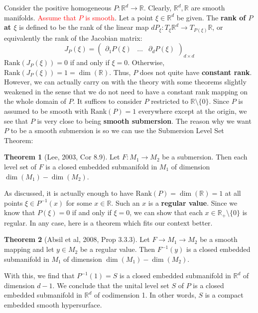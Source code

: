 \documentclass{article}
\theoremstyle{definition}
\newcommand{\p}{\partial}
\newcommand{\R}{\mathbb{R}}
\theoremstyle{theorem}
\newtheorem{theorem}{Theorem}[section]
\begin{document}
Consider the positive homogeneous $P: \R^d \to \R$. Clearly, $\R^d, \R$ are smooth manifolds. \textcolor{red}{Assume that $P$ is smooth}. Let a point $\xi\in \R^d$ be given. The \textbf{rank of $P$ at $\xi$} is defined to be the rank of the linear map $d P_\xi: T_\xi \R^d \to T_{P(\xi)} \R $, or equivalently the rank of the Jacobian matrix:
\begin{equation*}
    J_P(\xi) = \begin{pmatrix}
    \p_1 P(\xi) & \dots & \p_{d} P(\xi)
    \end{pmatrix}_{ d \times d}
\end{equation*}
$\text{Rank}(J_P(\xi)) = 0$ if and only if $\xi = 0$. Otherwise, $\text{Rank}(J_P(\xi)) = 1 = \dim(\R)$. Thus, $P$ does not quite have \textbf{constant rank}. However, we can actually carry on with the theory with some theorems slightly weakened in the sense that we do not need to have a constant
rank mapping on the whole domain of $P$. It suffices to consider $P$ restricted to $\R\setminus \{0 \}$.  Since $P$ is assumed to be smooth with $\text{Rank}(P) = 1$ everywhere except at the origin, we see that $P$ is very close to being \textbf{smooth submersion}. The reason why we want $P$ to be a smooth submersion is so we can use the Submersion Level Set Theorem:
\begin{theorem}[Lee, 2003, Cor 8.9]
Let $F: M_1 \to M_2$ be a submersion. Then each level set of $F$ is a closed embedded submanifold in $M_1$ of dimension $\dim(M_1) - \dim(M_2)$.  
\end{theorem}

As discussed, it is actually enough to have $\text{Rank}(P) = \dim(\R) = 1$ at all points $\xi \in P^{-1}(x)$ for some $x\in \R$. Such an $x$ is a \textbf{regular value}. Since we know that $P(\xi) = 0$ if and only if $\xi = 0$, we can show that each $x\in \R_+\setminus\{ 0 \}$ is regular. In any case, here is a theorem which fits our context better.

\begin{theorem}[Absil et al, 2008, Prop 3.3.3]
Let $F \to M_1 \to M_2$ be a smooth mapping and let $y\in M_2$ be a regular value. Then $F^{-1}(y)$ is a closed embedded submanifold in $M_1$ of dimension $\dim(M_1) - \dim(M_2)$.
\end{theorem}

With this, we find that $P^{-1}(1) = S$ is a closed embedded submanifold in $\R^d$ of dimension $d-1$. We conclude that the unital level set $S$ of $P$ is a closed embedded submanifold in $\R^d$ of codimension 1. In other words, $S$ is a compact embedded smooth hypersurface.  
\end{document}
